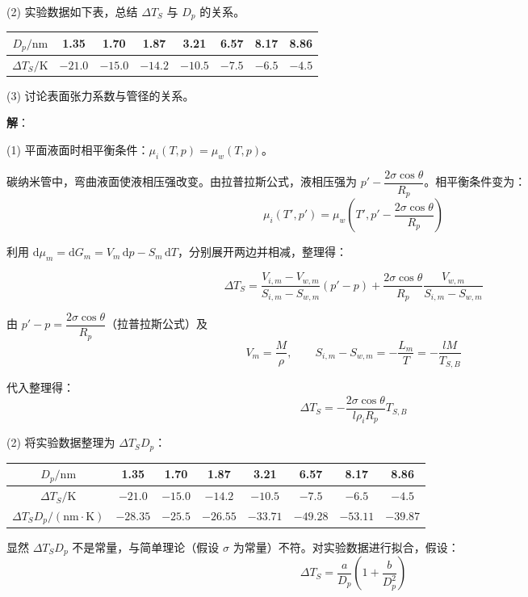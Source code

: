 \documentclass[UTF8]{ctexart}
\begin{document}
(2) 实验数据如下表，总结 $\Delta T_S$ 与 $D_p$ 的关系。

\begin{center}
\begin{tabular}{c|ccccccc}
\hline
$D_p/\mathrm{nm}$ & 1.35 & 1.70 & 1.87 & 3.21 & 6.57 & 8.17 & 8.86 \\
\hline
$\Delta T_S/\mathrm{K}$ & $-21.0$ & $-15.0$ & $-14.2$ & $-10.5$ & $-7.5$ & $-6.5$ & $-4.5$ \\
\hline
\end{tabular}
\end{center}

(3) 讨论表面张力系数与管径的关系。

\textbf{解}：

(1) 平面液面时相平衡条件：$\mu_i(T,p)=\mu_w(T,p)$。

碳纳米管中，弯曲液面使液相压强改变。由拉普拉斯公式，液相压强为 $p'-\dfrac{2\sigma\cos\theta}{R_p}$。相平衡条件变为：
\[
\mu_i(T',p')=\mu_w\!\left(T',p'-\frac{2\sigma\cos\theta}{R_p}\right)
\]

利用 $\mathrm{d}\mu_m=\mathrm{d}G_m=V_m\,\mathrm{d}p-S_m\,\mathrm{d}T$，分别展开两边并相减，整理得：

\[
\Delta T_S
=\frac{V_{i,m}-V_{w,m}}{S_{i,m}-S_{w,m}}(p'-p)
+\frac{2\sigma\cos\theta}{R_p}\frac{V_{w,m}}{S_{i,m}-S_{w,m}}
\]

由 $p'-p=\dfrac{2\sigma\cos\theta}{R_p}$（拉普拉斯公式）及
\[
V_m=\frac{M}{\rho},\qquad
S_{i,m}-S_{w,m}=-\frac{L_m}{T}=-\frac{lM}{T_{S,B}}
\]

代入整理得：
\[
\boxed{\Delta T_S=-\frac{2\sigma\cos\theta}{l\rho_i R_p}T_{S,B}}
\]

(2) 将实验数据整理为 $\Delta T_S D_p$：

\begin{center}
\begin{tabular}{c|ccccccc}
\hline
$D_p/\mathrm{nm}$ & 1.35 & 1.70 & 1.87 & 3.21 & 6.57 & 8.17 & 8.86 \\
\hline
$\Delta T_S/\mathrm{K}$ & $-21.0$ & $-15.0$ & $-14.2$ & $-10.5$ & $-7.5$ & $-6.5$ & $-4.5$ \\
\hline
$\Delta T_S D_p/(\mathrm{nm\cdot K})$ & $-28.35$ & $-25.5$ & $-26.55$ & $-33.71$ & $-49.28$ & $-53.11$ & $-39.87$ \\
\hline
\end{tabular}
\end{center}

显然 $\Delta T_S D_p$ 不是常量，与简单理论（假设 $\sigma$ 为常量）不符。对实验数据进行拟合，假设：
\[
\Delta T_S=\frac{a}{D_p}\left(1+\frac{b}{D_p^2}\right)
\]
\end{document}
